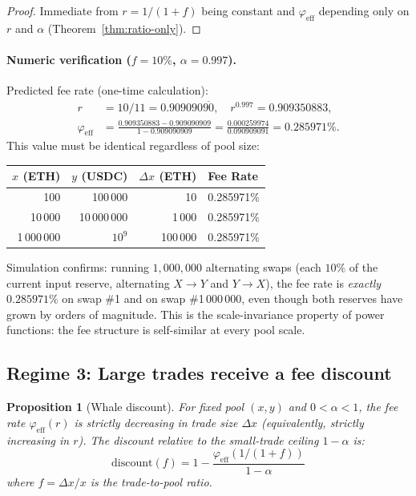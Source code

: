 \documentclass[11pt]{article}
\newtheorem{proposition}[theorem]{Proposition}
\theoremstyle{definition}
\theoremstyle{remark}
\newcommand{\dx}{\Delta x}
\begin{document}
\begin{proof}
Immediate from $r=1/(1+f)$ being constant and $\varphi_{\mathrm{eff}}$ depending only on $r$ and $\alpha$ (Theorem~\ref{thm:ratio-only}).
\end{proof}

\paragraph{Numeric verification ($f=10\%$, $\alpha=0.997$).}
Predicted fee rate (one-time calculation):
\begin{align*}
r &= 10/11 = 0.909090\overline{90},\quad
r^{0.997} = 0.909350883,\\
\varphi_{\mathrm{eff}} &= \frac{0.909350883 - 0.909090909}{1-0.909090909}
= \frac{0.000259974}{0.090909091} = 0.285971\%.
\end{align*}
This value must be identical regardless of pool size:

\begin{center}
\begin{tabular}{@{}rrrl@{}}
\toprule
$x$ (ETH) & $y$ (USDC) & $\dx$ (ETH) & Fee Rate \\
\midrule
100 & 100\,000 & 10 & 0.285971\% \\
10\,000 & 10\,000\,000 & 1\,000 & 0.285971\% \\
1\,000\,000 & $10^9$ & 100\,000 & 0.285971\% \\
\bottomrule
\end{tabular}
\end{center}

\noindent
Simulation confirms: running $1{,}000{,}000$ alternating swaps (each $10\%$ of the current input reserve, alternating $X{\to}Y$ and $Y{\to}X$), the fee rate is \emph{exactly} $0.285971\%$ on swap \#1 and on swap \#1\,000\,000, even though both reserves have grown by orders of magnitude.
This is the scale-invariance property of power functions: the fee structure is self-similar at every pool scale.

\subsection{Regime 3: Large trades receive a fee discount}

\begin{proposition}[Whale discount]\label{prop:regime3}
For fixed pool $(x,y)$ and $0<\alpha<1$, the fee rate $\varphi_{\mathrm{eff}}(r)$ is strictly decreasing in trade size $\dx$ (equivalently, strictly increasing in $r$).
The discount relative to the small-trade ceiling $1{-}\alpha$ is:
\[
\boxed{\mathrm{discount}(f)=1-\frac{\varphi_{\mathrm{eff}}(1/(1{+}f))}{1-\alpha}}
\]
where $f=\dx/x$ is the trade-to-pool ratio.
\end{proposition}
\end{document}
